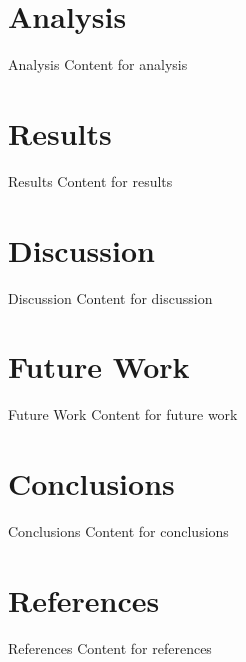 \section{Analysis}
\begin{frame}{Analysis}
    Content for analysis
\end{frame}

\section{Results}
\begin{frame}{Results}
    Content for results
\end{frame}

\section{Discussion}
\begin{frame}{Discussion}
    Content for discussion
\end{frame}

\section{Future Work}
\begin{frame}{Future Work}
    Content for future work
\end{frame}

\section{Conclusions}
\begin{frame}{Conclusions}
    Content for conclusions
\end{frame}

\section{References}
\begin{frame}{References}
    Content for references
\end{frame}


